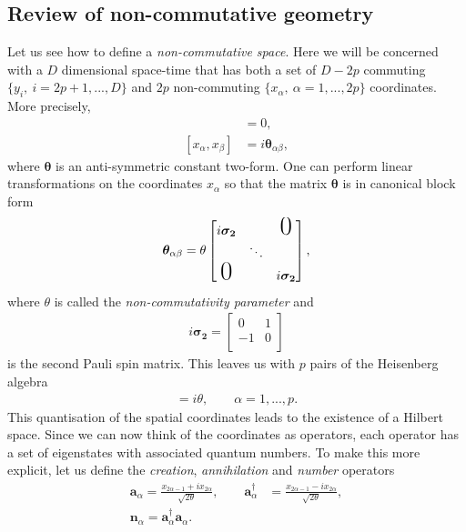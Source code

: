     \subsection{Review of non-commutative geometry}
    Let us see how to define a \textit{non-commutative space}. Here we will be concerned with a $D$ dimensional space-time that has both a set of $D-2p$ commuting $\{ y_i, \ i=2p+1,...,D\}$ and $2p$ non-commuting $\{ x_\alpha, \ \alpha =1,...,2p\}$ coordinates. More precisely,
    \begin{align}
        [y_i, y_j] &=0,\\
        [x_{\alpha}, x_{\beta}] &=i \bm{\theta}_{\alpha \beta}, \label{eq:space_time_commutations}
    \end{align}
    where ${ \bm \theta}$ is an anti-symmetric constant two-form. One can perform linear transformations on the coordinates $x_{\alpha}$ so that the matrix ${ \bm \theta}$ is in canonical block form
    \begin{align}
        \bm{\theta}_{\alpha \beta } = \theta \begin{bmatrix}
            i \bm{\sigma_2} &  & \text{\huge0} \\
                     & \ddots &  \\
                    \text{\huge0} &  & i \bm{\sigma_2} \\
                \end{bmatrix},
    \end{align}
    where $\theta$ is called the \textit{non-commutativity parameter} and
    \begin{align}
        i \bm{\sigma_2} = \begin{bmatrix}
            0 & 1 \\
            -1 & 0 \\
        \end{bmatrix}
    \end{align}
    is the second Pauli spin matrix.
    This leaves us with $p$ pairs of the Heisenberg algebra
    \begin{align}
        [x_{2\alpha -1}, x_{2\alpha}]=i\theta, \qquad \alpha=1,...,p.
    \end{align}
    This quantisation of the spatial coordinates leads to the existence of a Hilbert space. Since we can now think of the coordinates as operators, each operator has a set of eigenstates with associated quantum numbers. To make this more explicit, let us define the \textit{creation}, \textit{annihilation} and \textit{number} operators
    \begin{align}
        \bm{a}_{\alpha} = \frac{x_{2\alpha-1} +i x_{2\alpha}}{\sqrt{2 \theta}}, \qquad \bm{a}^{\dag}_{\alpha} &= \frac{x_{2\alpha-1} -i x_{2\alpha}}{\sqrt{2 \theta}}, \\
        \bm{n}_{\alpha} = \bm{a}^{\dag}_{\alpha}\bm{a}_{\alpha}.
    \end{align}

